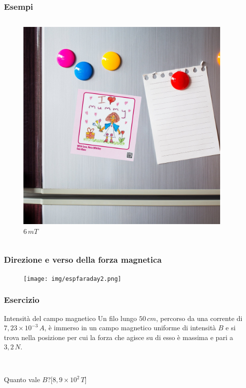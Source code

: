\documentclass[]{beamer}
\theoremstyle{plain}
\begin{document}
\begin{frame}
\frametitle{Esempi}
\begin{columns}
\begin{column}{0.4\textwidth}
\begin{figure}
\includegraphics[width=\columnwidth]{img/frigo.jpg}
$ 6 \, mT $
\end{figure}
\end{column}
\begin{column}{0.4\textwidth}
\end{column}
\end{columns}
\end{frame}



\begin{frame}
\frametitle{Direzione e verso della forza magnetica}
\begin{figure}
\texttt{[image: img/espfaraday2.png]}
\end{figure}
\end{frame}



\begin{frame}
\frametitle{Esercizio}
\begin{exampleblock}{Intensità del campo magnetico}
  Un filo lungo $ 50 \, cm $, percorso da una corrente di $ 7,23 \times 10^{-3} \, A $, è immerso in un campo magnetico uniforme di intensità $ B $ e si trova nella posizione per cui la forza che agisce su di esso è massima e pari a $ 3,2 \, N $.

  ~

  Quanto vale $ B $?\hspace{\fill}[$ 8,9 \times 10^{2} \, T $]
\end{exampleblock} 
\end{frame}
\end{document}
